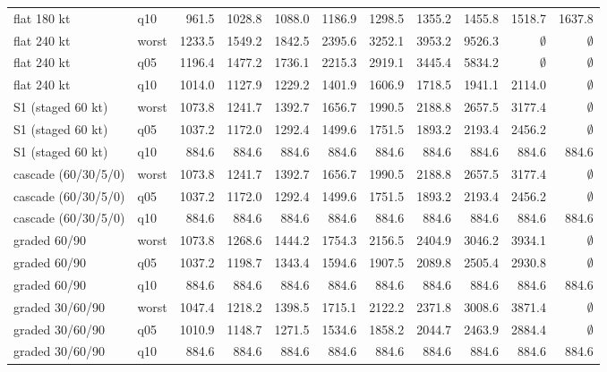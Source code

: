 \begin{longtable}{llrrrrrrrrr}
flat 180 kt & q10 & 961.5 & 1028.8 & 1088.0 & 1186.9 & 1298.5 & 1355.2 & 1455.8 & 1518.7 & 1637.8 \\
flat 240 kt & worst & 1233.5 & 1549.2 & 1842.5 & 2395.6 & 3252.1 & 3953.2 & 9526.3 & $\emptyset$ & $\emptyset$ \\
flat 240 kt & q05 & 1196.4 & 1477.2 & 1736.1 & 2215.3 & 2919.1 & 3445.4 & 5834.2 & $\emptyset$ & $\emptyset$ \\
flat 240 kt & q10 & 1014.0 & 1127.9 & 1229.2 & 1401.9 & 1606.9 & 1718.5 & 1941.1 & 2114.0 & $\emptyset$ \\
S1 (staged 60 kt) & worst & 1073.8 & 1241.7 & 1392.7 & 1656.7 & 1990.5 & 2188.8 & 2657.5 & 3177.4 & $\emptyset$ \\
S1 (staged 60 kt) & q05 & 1037.2 & 1172.0 & 1292.4 & 1499.6 & 1751.5 & 1893.2 & 2193.4 & 2456.2 & $\emptyset$ \\
S1 (staged 60 kt) & q10 & 884.6 & 884.6 & 884.6 & 884.6 & 884.6 & 884.6 & 884.6 & 884.6 & 884.6 \\
cascade (60/30/5/0) & worst & 1073.8 & 1241.7 & 1392.7 & 1656.7 & 1990.5 & 2188.8 & 2657.5 & 3177.4 & $\emptyset$ \\
cascade (60/30/5/0) & q05 & 1037.2 & 1172.0 & 1292.4 & 1499.6 & 1751.5 & 1893.2 & 2193.4 & 2456.2 & $\emptyset$ \\
cascade (60/30/5/0) & q10 & 884.6 & 884.6 & 884.6 & 884.6 & 884.6 & 884.6 & 884.6 & 884.6 & 884.6 \\
graded 60/90 & worst & 1073.8 & 1268.6 & 1444.2 & 1754.3 & 2156.5 & 2404.9 & 3046.2 & 3934.1 & $\emptyset$ \\
graded 60/90 & q05 & 1037.2 & 1198.7 & 1343.4 & 1594.6 & 1907.5 & 2089.8 & 2505.4 & 2930.8 & $\emptyset$ \\
graded 60/90 & q10 & 884.6 & 884.6 & 884.6 & 884.6 & 884.6 & 884.6 & 884.6 & 884.6 & 884.6 \\
graded 30/60/90 & worst & 1047.4 & 1218.2 & 1398.5 & 1715.1 & 2122.2 & 2371.8 & 3008.6 & 3871.4 & $\emptyset$ \\
graded 30/60/90 & q05 & 1010.9 & 1148.7 & 1271.5 & 1534.6 & 1858.2 & 2044.7 & 2463.9 & 2884.4 & $\emptyset$ \\
graded 30/60/90 & q10 & 884.6 & 884.6 & 884.6 & 884.6 & 884.6 & 884.6 & 884.6 & 884.6 & 884.6 \\
\end{longtable}
\endgroup
